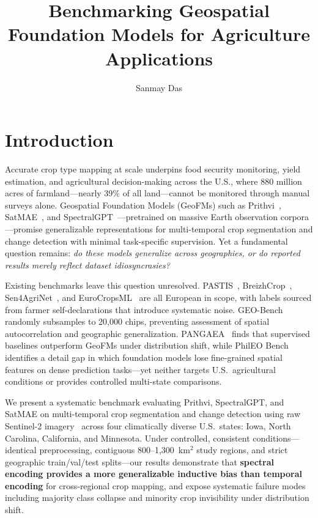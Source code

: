 \documentclass[sigconf, nonacm]{acmart}
\begin{document}
\title{Benchmarking Geospatial Foundation Models for
Agriculture Applications}

\author{Sanmay Das}

\maketitle

\section{Introduction}

Accurate crop type mapping at scale underpins food security
monitoring, yield estimation, and agricultural
decision-making across the U.S., where 880 million acres of
farmland---nearly 39\% of all land---cannot be monitored
through manual surveys alone. Geospatial Foundation Models
(GeoFMs) such as Prithvi~\cite{jakubik2023foundation},
SatMAE~\cite{cong2022satmae}, and
SpectralGPT~\cite{hong2024spectralgpt}---pretrained on
massive Earth observation corpora---promise generalizable
representations for multi-temporal crop segmentation and
change detection with minimal task-specific supervision.
Yet a fundamental question remains: \textit{do these models
generalize across geographies, or do reported results merely
reflect dataset idiosyncrasies?}

Existing benchmarks leave this question unresolved.
PASTIS~\cite{garnot2021panoptic},
BreizhCrop~\cite{russwurm2019breizhcrops},
Sen4AgriNet~\cite{sykas2021sen4agrinet}, and
EuroCropsML~\cite{reuss2025eurocropsml} are
all European in scope, with labels sourced from
farmer self-declarations that introduce systematic noise.
GEO-Bench~\cite{lacoste2023geobench} randomly subsamples
to 20{,}000 chips, preventing assessment of spatial
autocorrelation and geographic generalization.
PANGAEA~\cite{marsocci2024pangaea} finds that supervised
baselines outperform GeoFMs under distribution shift,
while PhilEO Bench~\cite{fibaek2024phileo} identifies a
detail gap in which foundation models lose fine-grained
spatial features on dense prediction tasks---yet neither
targets U.S.\ agricultural conditions or provides
controlled multi-state comparisons.

We present a systematic benchmark evaluating Prithvi,
SpectralGPT, and SatMAE on multi-temporal crop segmentation
and change detection using raw Sentinel-2
imagery~\cite{sentinel2_eoportal} across four climatically
diverse U.S.\ states: Iowa, North Carolina, California, and
Minnesota. Under controlled, consistent conditions---identical
preprocessing, contiguous 800--1{,}300~km$^{2}$ study
regions, and strict geographic train/val/test splits---our
results demonstrate that \textbf{spectral encoding provides
a more generalizable inductive bias than temporal encoding}
for cross-regional crop mapping, and expose systematic
failure modes including majority class collapse and
minority crop invisibility under distribution shift.
\end{document}
